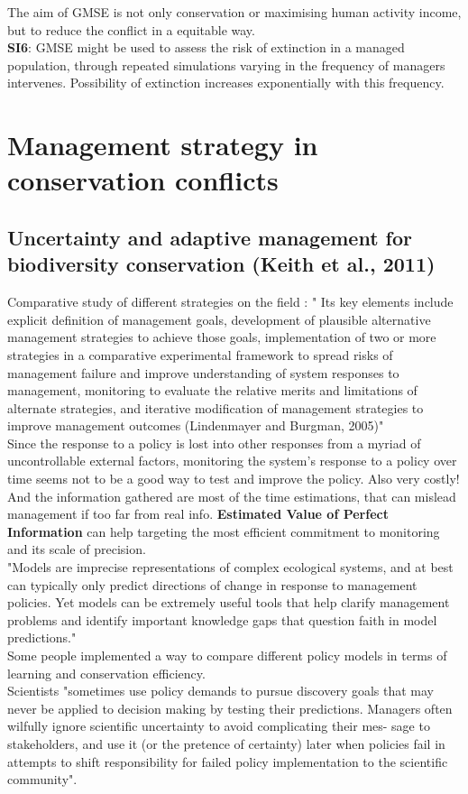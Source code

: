 \documentclass[12pt]{article}
\begin{document}
The aim of GMSE is not only conservation or maximising human activity income, but to reduce the conflict in a equitable way.\\

\textbf{SI6}: GMSE  might  be  used  to  assess  the  risk  of  extinction  in  a  managed  population, through repeated simulations varying in the frequency of managers intervenes. Possibility of extinction increases exponentially with this frequency.

\section{Management strategy in conservation conflicts}

\subsection{Uncertainty and adaptive management for biodiversity conservation (Keith et al., 2011)}

Comparative study of different strategies on the field : " Its key elements include explicit
definition of management goals, development of plausible alternative management strategies to achieve those goals, implementation of two or more strategies in a comparative experimental
framework to spread risks of management failure and improve
understanding of system responses to management, monitoring
to evaluate the relative merits and limitations of alternate strategies, and iterative modification of management strategies to improve management outcomes (Lindenmayer and Burgman, 2005)"\\
Since the response to a policy is lost into other responses from a myriad of uncontrollable external factors, monitoring the system's response to a policy over time seems not to be a good way to test and improve the policy. Also very costly! And the information gathered are most of the time estimations, that can mislead management if too far from real info. \textbf{Estimated Value of Perfect Information} can help targeting the most efficient commitment to monitoring and its scale of precision.\\
"Models are imprecise representations of complex ecological
systems, and at best can typically only predict directions of change
in response to management policies. Yet models can be extremely
useful tools that help clarify management problems and identify
important knowledge gaps that question faith in model predictions."\\
Some people implemented a way to compare different policy models in terms of learning and conservation efficiency.\\
Scientists "sometimes use policy
demands to pursue discovery goals that may never be applied to
decision making by testing their predictions. Managers often wilfully ignore scientific uncertainty to avoid complicating their mes-
sage to stakeholders, and use it (or the pretence of certainty) later
when policies fail in attempts to shift responsibility for failed policy implementation to the scientific community".
\end{document}
